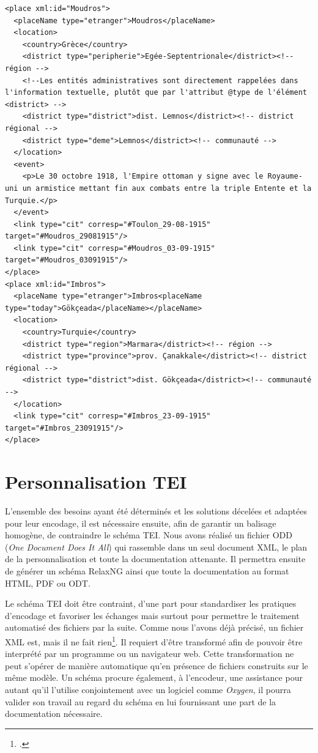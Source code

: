 \documentclass[12pt,a4paper]{book} %
\begin{document}
\begin{lstlisting}
<place xml:id="Moudros">               
  <placeName type="etranger">Moudros</placeName>                  
  <location>
    <country>Grèce</country>
    <district type="peripherie">Egée-Septentrionale</district><!-- région -->
    <!--Les entités administratives sont directement rappelées dans l'information textuelle, plutôt que par l'attribut @type de l'élément <district> -->
    <district type="district">dist. Lemnos</district><!-- district régional -->
    <district type="deme">Lemnos</district><!-- communauté -->                                            
  </location>
  <event>
    <p>Le 30 octobre 1918, l'Empire ottoman y signe avec le Royaume-uni un armistice mettant fin aux combats entre la triple Entente et la Turquie.</p>
  </event>                  
  <link type="cit" corresp="#Toulon_29-08-1915" target="#Moudros_29081915"/>
  <link type="cit" corresp="#Moudros_03-09-1915" target="#Moudros_03091915"/>                  
</place>
<place xml:id="Imbros">               
  <placeName type="etranger">Imbros<placeName type="today">Gökçeada</placeName></placeName>                  
  <location>
    <country>Turquie</country>
    <district type="region">Marmara</district><!-- région -->
    <district type="province">prov. Çanakkale</district><!-- district régional -->
    <district type="district">dist. Gökçeada</district><!-- communauté -->                                            
  </location>                                       
  <link type="cit" corresp="#Imbros_23-09-1915" target="#Imbros_23091915"/>                  
</place>
\end{lstlisting}
\bigskip

\chapter{Personnalisation TEI}

L'ensemble des besoins ayant été déterminés et les solutions  décelées et adaptées pour leur encodage, il est nécessaire ensuite, afin de garantir un balisage homogène, de contraindre le schéma TEI. Nous avons réalisé un fichier ODD (\textit{One Document Does It All}) qui rassemble dans un seul document XML, le plan de la personnalisation et toute la documentation attenante. Il permettra ensuite de générer un schéma RelaxNG ainsi que toute la documentation au format HTML, PDF ou ODT.

Le schéma TEI doit être contraint, d'une part pour standardiser les pratiques d'encodage et favoriser les échanges mais surtout pour permettre le traitement automatisé des fichiers par la suite. Comme nous l'avons déjà précisé, \og un fichier XML est, mais il ne fait rien\fg{}\footcite{harold_xml_2005}. Il requiert d'être transformé afin de pouvoir être interprété par un programme ou un navigateur web. Cette transformation ne peut s'opérer de manière automatique qu'en présence de fichiers construits sur le même modèle.
Un schéma procure également, à l'encodeur, une assistance pour autant qu'il l'utilise conjointement avec un logiciel comme \textit{Oxygen}, il pourra  valider son travail au regard du schéma en lui fournissant  une part de la documentation nécessaire.
\end{document}
